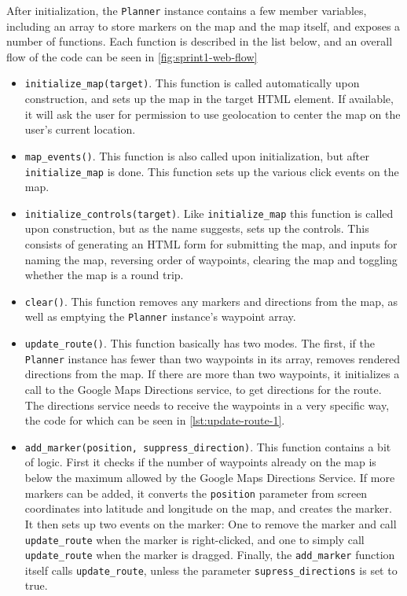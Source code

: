 After initialization, the \texttt{Planner} instance contains a few member variables, including an array to store markers on the map and the map itself, and exposes a number of functions. Each function is described in the list below, and an overall flow of the code can be seen in \autoref{fig:sprint1-web-flow}
\begin{itemize}
 \item \texttt{initialize\_map(target)}. This function is called automatically upon construction, and sets up the map in the target \ac{HTML} element. If available, it will ask the user for permission to use geolocation\cite{geolocation} to center the map on the user's current location.
 \item \texttt{map\_events()}. This function is also called upon initialization, but after \texttt{initialize\_map} is done. This function sets up the various click events on the map.
 \item \texttt{initialize\_controls(target)}. Like \texttt{initialize\_map} this function is called upon construction, but as the name suggests, sets up the controls. This consists of generating an \ac{HTML} form for submitting the map, and inputs for naming the map, reversing order of waypoints, clearing the map and toggling whether the map is a round trip.
 \item \texttt{clear()}. This function removes any markers and directions from the map, as well as emptying the \texttt{Planner} instance's waypoint array.
 \item \texttt{update\_route()}. This function basically has two modes. The first, if the \texttt{Planner} instance has fewer than two waypoints in its array, removes rendered directions from the map. If there are more than two waypoints, it initializes a call to the Google Maps Directions service, to get directions for the route. The directions service needs to receive the waypoints in a very specific way, the code for which can be seen in \autoref{lst:update-route-1}.
 \item \texttt{add\_marker(position, suppress\_direction)}. This function contains a bit of logic. First it checks if the number of waypoints already on the map is below the maximum allowed by the Google Maps Directions Service. If more markers can be added, it converts the \texttt{position} parameter from screen coordinates into latitude and longitude on the map, and creates the marker. It then sets up two events on the marker: One to remove the marker and call \texttt{update\_route} when the marker is right-clicked, and one to simply call \texttt{update\_route} when the marker is dragged. Finally, the \texttt{add\_marker} function itself calls \texttt{update\_route}, unless the parameter \texttt{supress\_directions} is set to true.

\end{itemize}
